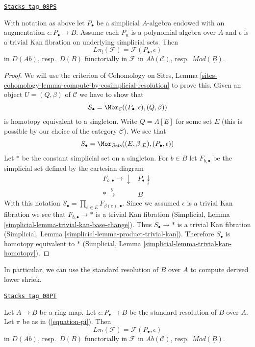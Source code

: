\begin{lemma}
\label{cotangent-lemma-identify-pi-shriek}
\href{https://stacks.math.columbia.edu/tag/08PS}{\texttt{Stacks tag 08PS}}

With notation as above let $P_\bullet$ be a simplicial $A$-algebra
endowed with an augmentation $\epsilon : P_\bullet \to B$.
Assume each $P_n$ is a polynomial algebra over $A$ and $\epsilon$
is a trivial Kan fibration on underlying simplicial sets. Then
$$
L\pi_!(\mathcal{F}) = \mathcal{F}(P_\bullet, \epsilon)
$$
in $D(\textit{Ab})$, resp.\ $D(B)$ functorially in $\mathcal{F}$ in
$\textit{Ab}(\mathcal{C})$, resp.\ $\textit{Mod}(\underline{B})$.
\end{lemma}

\begin{proof}
We will use the criterion of Cohomology on Sites, Lemma
\ref{sites-cohomology-lemma-compute-by-cosimplicial-resolution} to prove this.
Given an object $U = (Q, \beta)$ of $\mathcal{C}$ we have to show that
$$
S_\bullet = \Mor_\mathcal{C}((P_\bullet, \epsilon), (Q, \beta))
$$
is homotopy equivalent to a singleton.
Write $Q = A[E]$ for some set $E$ (this is possible by our choice of
the category $\mathcal{C}$). We see that
$$
S_\bullet = \Mor_{\textit{Sets}}((E, \beta|_E), (P_\bullet, \epsilon))
$$
Let $*$ be the constant simplicial set on a singleton. For $b \in B$
let $F_{b, \bullet}$ be the simplicial set defined by the cartesian
diagram
$$
\begin{array}{cc}F_{b, \bullet} \longrightarrow\downarrow & P_\bullet \underset{\epsilon}{\downarrow} \\ {*} \overset{b}{\longrightarrow} & B\end{array}
$$
With this notation $S_\bullet = \prod_{e \in E} F_{\beta(e), \bullet}$.
Since we assumed $\epsilon$ is a trivial Kan fibration we see that
$F_{b, \bullet} \to *$ is a trivial Kan fibration
(Simplicial, Lemma \ref{simplicial-lemma-trivial-kan-base-change}).
Thus $S_\bullet \to *$ is a trivial Kan fibration
(Simplicial, Lemma \ref{simplicial-lemma-product-trivial-kan}).
Therefore $S_\bullet$ is homotopy equivalent to $*$
(Simplicial, Lemma \ref{simplicial-lemma-trivial-kan-homotopy}).
\end{proof}

In particular, we can use the standard resolution of $B$ over $A$
to compute derived lower shriek.

\begin{lemma}
\label{cotangent-lemma-pi-shriek-standard}
\href{https://stacks.math.columbia.edu/tag/08PT}{\texttt{Stacks tag 08PT}}

Let $A \to B$ be a ring map. Let $\epsilon : P_\bullet \to B$
be the standard resolution of $B$ over $A$. Let $\pi$ be as in
(\ref{equation-pi}). Then
$$
L\pi_!(\mathcal{F}) = \mathcal{F}(P_\bullet, \epsilon)
$$
in $D(\textit{Ab})$, resp.\ $D(B)$ functorially in $\mathcal{F}$ in
$\textit{Ab}(\mathcal{C})$, resp.\ $\textit{Mod}(\underline{B})$.
\end{lemma}

